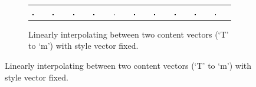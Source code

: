 {\begin{figure}
	\begin{subfigure}[t]{\textwidth}
	\begin{tabu} to \textwidth {XXXXXXXXXX}
		\includegraphics[width=0.09\textwidth]{tensors/sandc/interp/output0} &
		\includegraphics[width=0.09\textwidth]{tensors/sandc/interp/output1} &
		\includegraphics[width=0.09\textwidth]{tensors/sandc/interp/output2} &
		\includegraphics[width=0.09\textwidth]{tensors/sandc/interp/output3} &
		\includegraphics[width=0.09\textwidth]{tensors/sandc/interp/output4} &
		\includegraphics[width=0.09\textwidth]{tensors/sandc/interp/output5} &
		\includegraphics[width=0.09\textwidth]{tensors/sandc/interp/output6} &
		\includegraphics[width=0.09\textwidth]{tensors/sandc/interp/output7} &
		\includegraphics[width=0.09\textwidth]{tensors/sandc/interp/output8} &
		\includegraphics[width=0.09\textwidth]{tensors/sandc/interp/output9} 
	\end{tabu}
	\caption{Linearly interpolating between two content vectors (`T' to `m') with style vector
			 fixed.}
	\end{subfigure}
	

\end{figure}}
